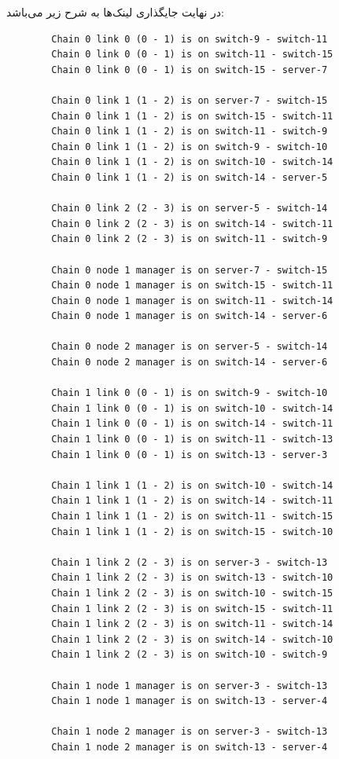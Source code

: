 در نهایت جایگذاری لینک‌ها به شرح زیر می‌باشد:

\begin{latin}
    \begin{verbatim}
        Chain 0 link 0 (0 - 1) is on switch-9 - switch-11
        Chain 0 link 0 (0 - 1) is on switch-11 - switch-15
        Chain 0 link 0 (0 - 1) is on switch-15 - server-7

        Chain 0 link 1 (1 - 2) is on server-7 - switch-15
        Chain 0 link 1 (1 - 2) is on switch-15 - switch-11
        Chain 0 link 1 (1 - 2) is on switch-11 - switch-9
        Chain 0 link 1 (1 - 2) is on switch-9 - switch-10
        Chain 0 link 1 (1 - 2) is on switch-10 - switch-14
        Chain 0 link 1 (1 - 2) is on switch-14 - server-5

        Chain 0 link 2 (2 - 3) is on server-5 - switch-14
        Chain 0 link 2 (2 - 3) is on switch-14 - switch-11
        Chain 0 link 2 (2 - 3) is on switch-11 - switch-9

        Chain 0 node 1 manager is on server-7 - switch-15
        Chain 0 node 1 manager is on switch-15 - switch-11
        Chain 0 node 1 manager is on switch-11 - switch-14
        Chain 0 node 1 manager is on switch-14 - server-6

        Chain 0 node 2 manager is on server-5 - switch-14
        Chain 0 node 2 manager is on switch-14 - server-6

        Chain 1 link 0 (0 - 1) is on switch-9 - switch-10
        Chain 1 link 0 (0 - 1) is on switch-10 - switch-14
        Chain 1 link 0 (0 - 1) is on switch-14 - switch-11
        Chain 1 link 0 (0 - 1) is on switch-11 - switch-13
        Chain 1 link 0 (0 - 1) is on switch-13 - server-3

        Chain 1 link 1 (1 - 2) is on switch-10 - switch-14
        Chain 1 link 1 (1 - 2) is on switch-14 - switch-11
        Chain 1 link 1 (1 - 2) is on switch-11 - switch-15
        Chain 1 link 1 (1 - 2) is on switch-15 - switch-10

        Chain 1 link 2 (2 - 3) is on server-3 - switch-13
        Chain 1 link 2 (2 - 3) is on switch-13 - switch-10
        Chain 1 link 2 (2 - 3) is on switch-10 - switch-15
        Chain 1 link 2 (2 - 3) is on switch-15 - switch-11        
        Chain 1 link 2 (2 - 3) is on switch-11 - switch-14
        Chain 1 link 2 (2 - 3) is on switch-14 - switch-10
        Chain 1 link 2 (2 - 3) is on switch-10 - switch-9

        Chain 1 node 1 manager is on server-3 - switch-13
        Chain 1 node 1 manager is on switch-13 - server-4

        Chain 1 node 2 manager is on server-3 - switch-13
        Chain 1 node 2 manager is on switch-13 - server-4
    \end{verbatim}
\end{latin}

